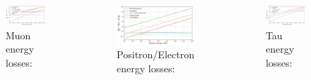 \begin{frame}{}
\begin{minipage}[t][1cm][t]{\textwidth}
  \vspace{-20pt}
  \begin{columns}[t]
    \begin{figure}
      \caption*{Muon energy losses:}
      \vspace{-9pt}
      \includegraphics[width=\linewidth, height=.37\textheight, keepaspectratio]{plots/muon_dEdx.png}
    \end{figure}
    \vspace{-15pt}
    \begin{figure}
      \caption*{Positron/Electron energy losses:}
      \vspace{-9pt}
      \includegraphics[width=\linewidth, height=.37\textheight, keepaspectratio]{plots/positron_dEdx.png}
    \end{figure}
    \vspace{-20pt}
    \begin{figure}
      \caption*{Tau energy losses:}
      \vspace{-9pt}
      \includegraphics[width=\linewidth, height=.37\textheight, keepaspectratio]{plots/tau_dEdx.png}

\end{figure}
\end{columns}
\end{minipage}
\end{frame}
